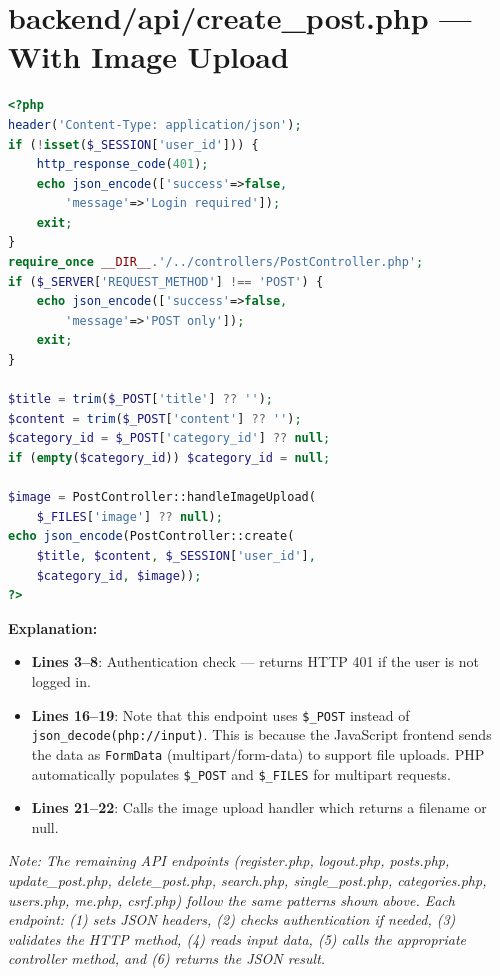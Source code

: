 \documentclass[12pt,a4paper]{report}
\begin{document}
\section{backend/api/create\_post.php --- With Image Upload}

\begin{lstlisting}[language=PHP]
<?php
header('Content-Type: application/json');
if (!isset($_SESSION['user_id'])) {
    http_response_code(401);
    echo json_encode(['success'=>false,
        'message'=>'Login required']);
    exit;
}
require_once __DIR__.'/../controllers/PostController.php';
if ($_SERVER['REQUEST_METHOD'] !== 'POST') {
    echo json_encode(['success'=>false,
        'message'=>'POST only']);
    exit;
}

$title = trim($_POST['title'] ?? '');
$content = trim($_POST['content'] ?? '');
$category_id = $_POST['category_id'] ?? null;
if (empty($category_id)) $category_id = null;

$image = PostController::handleImageUpload(
    $_FILES['image'] ?? null);
echo json_encode(PostController::create(
    $title, $content, $_SESSION['user_id'],
    $category_id, $image));
?>
\end{lstlisting}

\textbf{Explanation:}
\begin{itemize}
    \item \textbf{Lines 3--8}: Authentication check --- returns HTTP 401 if the user is not logged in.
    \item \textbf{Lines 16--19}: Note that this endpoint uses \texttt{\$\_POST} instead of \texttt{json\_decode(php://input)}. This is because the JavaScript frontend sends the data as \texttt{FormData} (multipart/form-data) to support file uploads. PHP automatically populates \texttt{\$\_POST} and \texttt{\$\_FILES} for multipart requests.
    \item \textbf{Lines 21--22}: Calls the image upload handler which returns a filename or null.
\end{itemize}

\textit{Note: The remaining API endpoints (register.php, logout.php, posts.php, update\_post.php, delete\_post.php, search.php, single\_post.php, categories.php, users.php, me.php, csrf.php) follow the same patterns shown above. Each endpoint: (1) sets JSON headers, (2) checks authentication if needed, (3) validates the HTTP method, (4) reads input data, (5) calls the appropriate controller method, and (6) returns the JSON result.}
\end{document}
